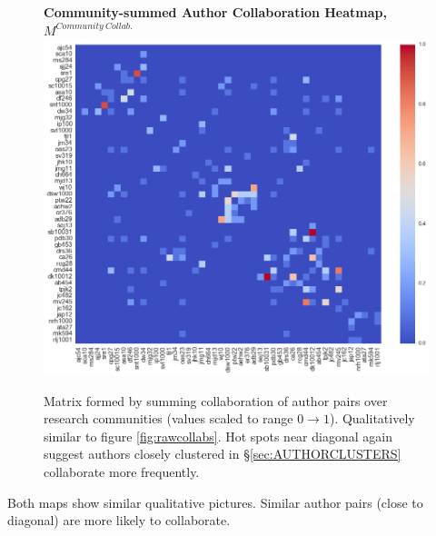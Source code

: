   \begin{figure}[H]
  \centering
  \textbf{Community-summed Author Collaboration Heatmap, $M^{Community\ Collab.}$}
    \includegraphics[width=\textwidth]{Analysis/comm_collabs.png}
    \caption[Community-summed Author Collaboration Heatmap]{Matrix formed by summing collaboration of author pairs over research communities (values scaled to range $0 \rightarrow 1$). Qualitatively similar to figure \ref{fig:rawcollabs}. Hot spots near diagonal again suggest authors closely clustered in \S\ref{sec:AUTHORCLUSTERS} collaborate more frequently.}
      \label{fig:collcollabs}
\end{figure}
Both maps show similar qualitative pictures. Similar author pairs (close to diagonal) are more likely to collaborate. 

